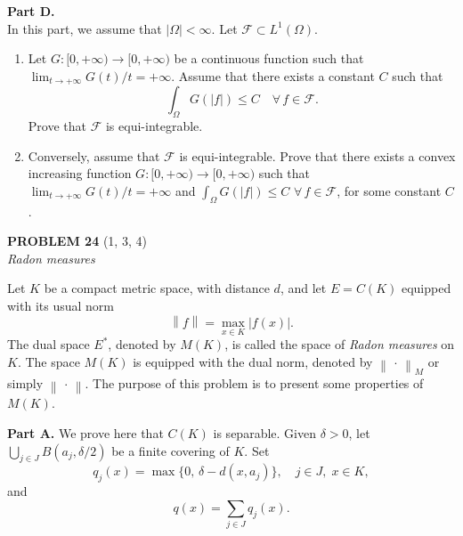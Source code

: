 \documentclass[12pt]{article}
\newcommand{\norm}[1]{\left\|#1\right\|}
\newcommand{\abs}[1]{\left|#1\right|}
\begin{document}
\noindent\textbf{Part D.}\\
In this part, we assume that $\abs{\Omega} < \infty$. Let $\mathcal{F} \subset L^1(\Omega)$.
 
\begin{enumerate}
\item Let $G : [0,+\infty) \to [0,+\infty)$ be a continuous function such that $\lim_{t\to+\infty} G(t)/t = +\infty$.
Assume that there exists a constant $C$ such that
\[
\int_\Omega G(\abs{f}) \le C \quad \forall\, f \in \mathcal{F}.
\]
Prove that $\mathcal{F}$ is equi-integrable.
 
\item Conversely, assume that $\mathcal{F}$ is equi-integrable. Prove that there exists a convex
increasing function $G : [0,+\infty) \to [0,+\infty)$ such that $\lim_{t\to+\infty} G(t)/t = +\infty$
and $\int_\Omega G(\abs{f}) \le C$ $\forall\, f \in \mathcal{F}$, for some constant $C$.
 
\end{enumerate}
 
 
\bigskip
 
\noindent\textbf{PROBLEM 24} (1, 3, 4)\\[4pt]
\textit{Radon measures}
 
\medskip
 
Let $K$ be a compact metric space, with distance $d$, and let $E = C(K)$ equipped
with its usual norm
\[
\norm{f} = \max_{x \in K} \abs{f(x)}.
\]
The dual space $E^*$, denoted by $M(K)$, is called the space of \emph{Radon measures} on $K$.
The space $M(K)$ is equipped with the dual norm, denoted by $\norm{\,\cdot\,}_M$ or simply $\norm{\,\cdot\,}$.
The purpose of this problem is to present some properties of $M(K)$.
 
\medskip
 
\noindent\textbf{Part A.} We prove here that $C(K)$ is separable. Given $\delta > 0$, let $\bigcup_{j \in J} B(a_j, \delta/2)$
be a finite covering of $K$. Set
\[
q_j(x) = \max\{0,\, \delta - d(x, a_j)\}, \quad j \in J,\; x \in K,
\]
and
\[
q(x) = \sum_{j \in J} q_j(x).
\]
 
\end{document}
